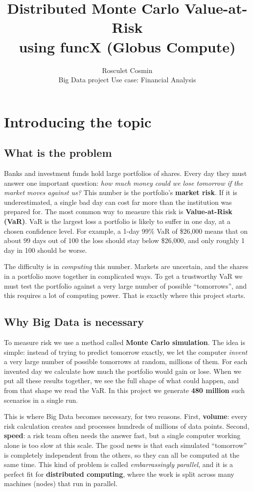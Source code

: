 \documentclass[11pt,a4paper]{article}
\title{\textbf{Distributed Monte Carlo Value-at-Risk\\ using funcX (Globus Compute)}}
\author{Rosculet Cosmin\\[2pt] \small Big Data project \;\textbar\; Use case: Financial Analysis}
\date{}
\begin{document}
\maketitle

\section{Introducing the topic}

\subsection{What is the problem}

Banks and investment funds hold large portfolios of shares. Every day they must answer one important question: \textit{how much money could we lose tomorrow if the market moves against us?} This number is the portfolio's \textbf{market risk}. If it is underestimated, a single bad day can cost far more than the institution was prepared for. The most common way to measure this risk is \textbf{Value-at-Risk (VaR)}. VaR is the largest loss a portfolio is likely to suffer in one day, at a chosen confidence level. For example, a 1-day 99\% VaR of \$26,000 means that on about 99 days out of 100 the loss should stay below \$26,000, and only roughly 1 day in 100 should be worse.

The difficulty is in \textit{computing} this number. Markets are uncertain, and the shares in a portfolio move together in complicated ways. To get a trustworthy VaR we must test the portfolio against a very large number of possible ``tomorrows'', and this requires a lot of computing power. That is exactly where this project starts.

\subsection{Why Big Data is necessary}

To measure risk we use a method called \textbf{Monte Carlo simulation}. The idea is simple: instead of trying to predict tomorrow exactly, we let the computer \textit{invent} a very large number of possible tomorrows at random, millions of them. For each invented day we calculate how much the portfolio would gain or lose. When we put all these results together, we see the full shape of what could happen, and from that shape we read the VaR. In this project we generate \textbf{480 million} such scenarios in a single run.

This is where Big Data becomes necessary, for two reasons. First, \textbf{volume}: every risk calculation creates and processes hundreds of millions of data points. Second, \textbf{speed}: a risk team often needs the answer fast, but a single computer working alone is too slow at this scale. The good news is that each simulated ``tomorrow'' is completely independent from the others, so they can all be computed at the same time. This kind of problem is called \textit{embarrassingly parallel}, and it is a perfect fit for \textbf{distributed computing}, where the work is split across many machines (nodes) that run in parallel.
\end{document}
